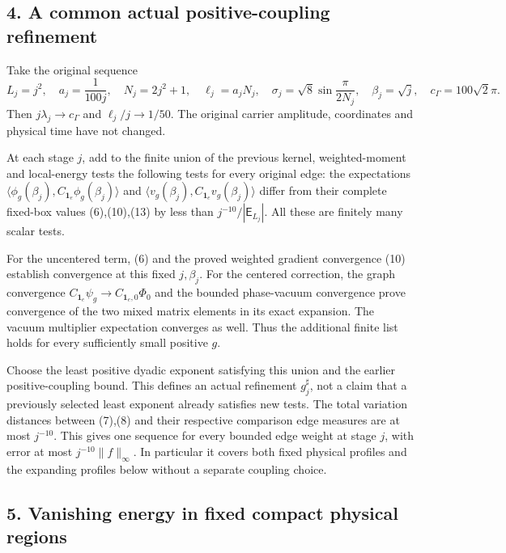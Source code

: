 \documentclass[
  11pt,
]{article}
\begin{document}
\subsection{4. A common actual positive-coupling
refinement}\label{weak-coupling-part-12-a-common-actual-positive-coupling-refinement}

Take the original sequence \[
 L_j=j^2,\quad a_j=\frac1{100j},\quad N_j=2j^2+1,\quad
 \ell_j=a_jN_j,\quad
 \sigma_j=\sqrt8\sin\frac{\pi}{2N_j},\quad
 \beta_j=\sqrt j,\quad c_\Gamma=100\sqrt2\pi .
 \tag{15}
\] Then \(j\lambda_j\to c_\Gamma\) and \(\ell_j/j\to1/50\). The original
carrier amplitude, coordinates and physical time have not changed.

At each stage \(j\), add to the finite union of the previous kernel,
weighted-moment and local-energy tests the following tests for every
original edge: the expectations
\(\langle\phi_g(\beta_j),C_{\mathbf1_e}\phi_g(\beta_j)\rangle\) and
\(\langle v_g(\beta_j),C_{\mathbf1_e}v_g(\beta_j)\rangle\) differ from
their complete fixed-box values (6),(10),(13) by less than
\(j^{-10}/|\mathsf E_{L_j}|\). All these are finitely many scalar tests.

For the uncentered term, (6) and the proved weighted gradient
convergence (10) establish convergence at this fixed \(j,\beta_j\). For
the centered correction, the graph convergence
\(C_{\mathbf1_e}\psi_g\to C_{\mathbf1_e,0}\Phi_0\) and the bounded
phase-vacuum convergence prove convergence of the two mixed matrix
elements in its exact expansion. The vacuum multiplier expectation
converges as well. Thus the additional finite list holds for every
sufficiently small positive \(g\).

Choose the least positive dyadic exponent satisfying this union and the
earlier positive-coupling bound. This defines an actual refinement
\(g_j^\sharp\), not a claim that a previously selected least exponent
already satisfies new tests. The total variation distances between
(7),(8) and their respective comparison edge measures are at most
\(j^{-10}\). This gives one sequence for every bounded edge weight at
stage \(j\), with error at most \(j^{-10}\|f\|_\infty\). In particular
it covers both fixed physical profiles and the expanding profiles below
without a separate coupling choice.

\subsection{5. Vanishing energy in fixed compact physical
regions}\label{weak-coupling-part-12-vanishing-energy-in-fixed-compact-physical-regions}
\end{document}

